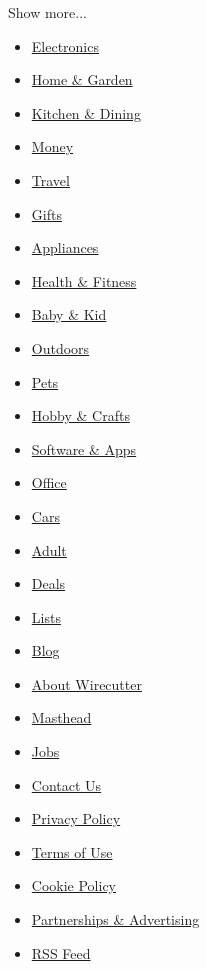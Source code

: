 Show more...

\begin{itemize}
\tightlist
\item
  \href{/wirecutter/electronics/}{Electronics}
\item
  \href{/wirecutter/home-garden/}{Home \& Garden}
\item
  \href{/wirecutter/kitchen-dining/}{Kitchen \& Dining}
\item
  \href{/wirecutter/money/}{Money}
\item
  \href{/wirecutter/travel/}{Travel}
\item
  \href{/wirecutter/gifts/}{Gifts}
\item
  \href{/wirecutter/appliances/}{Appliances}
\item
  \href{/wirecutter/health-fitness/}{Health \& Fitness}
\item
  \href{/wirecutter/baby-kid/}{Baby \& Kid}
\item
  \href{/wirecutter/outdoors/}{Outdoors}
\item
  \href{/wirecutter/pets/}{Pets}
\item
  \href{/wirecutter/hobby-crafts/}{Hobby \& Crafts}
\item
  \href{/wirecutter/software/}{Software \& Apps}
\item
  \href{/wirecutter/office/}{Office}
\item
  \href{/wirecutter/cars/}{Cars}
\item
  \href{/wirecutter/adult/}{Adult}
\item
  \href{/wirecutter/deals/}{Deals}
\item
  \href{/wirecutter/lists/}{Lists}
\item
  \href{/wirecutter/blog/}{Blog}
\end{itemize}

\begin{itemize}
\tightlist
\item
  \href{/wirecutter/about/}{About Wirecutter}
\item
  \href{/wirecutter/masthead/}{Masthead}
\item
  \href{/wirecutter/jobs/}{Jobs}
\item
  \href{/wirecutter/contact-us/}{Contact Us}
\end{itemize}

\begin{itemize}
\tightlist
\item
  \href{https://www.nytimes3xbfgragh.onion/subscription/privacy-policy\#/privacy}{Privacy
  Policy}
\item
  \href{https://help.nytimes3xbfgragh.onion/hc/en-us/articles/115014893428-Terms-of-service}{Terms
  of Use}
\item
  \href{https://www.nytimes3xbfgragh.onion/subscription/privacy-policy\#/cookie}{Cookie
  Policy}
\item
  \href{/wirecutter/partners/}{Partnerships \& Advertising}
\item
  \href{/wirecutter/feed/}{RSS Feed}
\end{itemize}

